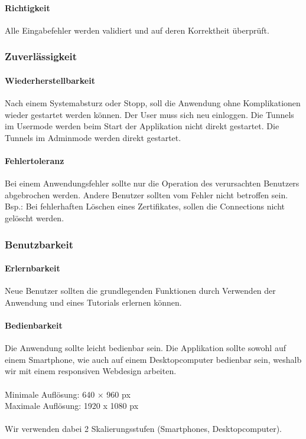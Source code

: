 \paragraph{Richtigkeit}
Alle Eingabefehler werden validiert und auf deren Korrektheit überprüft.

\subsubsection{Zuverlässigkeit}

\paragraph{Wiederherstellbarkeit}
Nach einem Systemabsturz oder Stopp, soll die Anwendung ohne Komplikationen wieder gestartet werden können. Der User muss sich neu einloggen. Die Tunnels im Usermode werden beim Start der Applikation nicht direkt gestartet. Die Tunnels im Adminmode werden direkt gestartet.

\paragraph{Fehlertoleranz}
Bei einem Anwendungsfehler sollte nur die Operation des verursachten Benutzers abgebrochen werden. Andere Benutzer sollten vom Fehler nicht betroffen sein.\\
Bsp.: Bei fehlerhaften Löschen eines Zertifikates, sollen die Connections nicht gelöscht werden.
\subsubsection{Benutzbarkeit}

\paragraph{Erlernbarkeit}
Neue Benutzer sollten die grundlegenden Funktionen durch Verwenden der Anwendung und eines Tutorials erlernen können.

\paragraph{Bedienbarkeit}
Die Anwendung sollte leicht bedienbar sein. Die Applikation sollte sowohl auf einem Smartphone, wie auch auf einem Desktopcomputer bedienbar sein, weshalb wir mit einem responsiven Webdesign arbeiten. \\\\
Minimale Auflösung: 	640 × 960 px \\
Maximale Auflösung: 	1920 x 1080 px \\\\
Wir verwenden dabei 2 Skalierungsstufen (Smartphones, Desktopcomputer).

